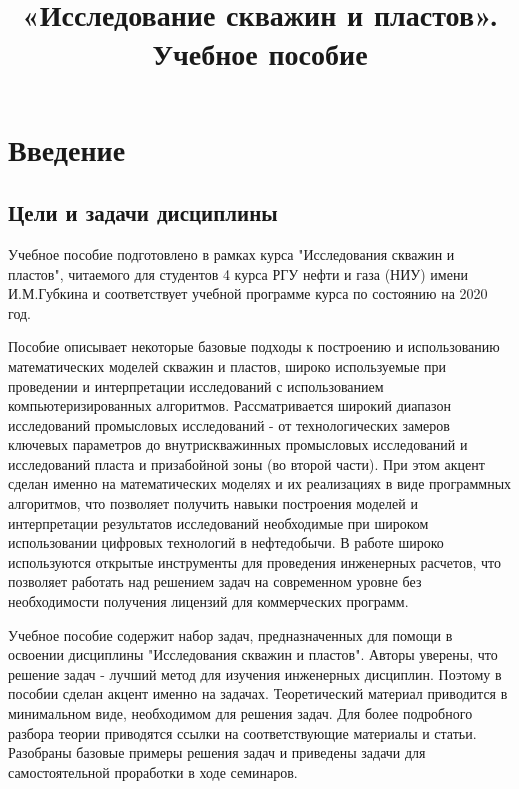 \documentclass{memoir}
\begin{document}
\title{«Исследование скважин и пластов». Учебное пособие }

\maketitle

\tableofcontents{}
\chapter{Введение}

\section{Цели и задачи дисциплины}
Учебное пособие подготовлено в рамках курса "Исследования скважин и пластов", читаемого для студентов 4 курса РГУ нефти и газа (НИУ) имени И.М.Губкина и соответствует учебной программе курса по состоянию на 2020 год. 

Пособие описывает некоторые базовые подходы к построению и использованию математических моделей скважин и пластов, широко используемые при проведении и интерпретации исследований с использованием компьютеризированных алгоритмов. Рассматривается широкий диапазон исследований промысловых исследований - от технологических замеров ключевых параметров до внутрискважинных промысловых исследований и исследований пласта и призабойной зоны (во второй части). При этом акцент сделан именно на математических моделях и их реализациях в виде программных алгоритмов, что позволяет получить навыки построения моделей и интерпретации результатов исследований необходимые при широком использовании цифровых технологий в нефтедобычи. В работе широко используются открытые инструменты для проведения инженерных расчетов, что позволяет работать над решением задач на современном уровне без необходимости получения лицензий для коммерческих программ. 

Учебное пособие содержит набор задач, предназначенных для помощи в освоении дисциплины "Исследования скважин и пластов". Авторы уверены, что решение задач - лучший метод для изучения инженерных дисциплин. Поэтому в пособии сделан акцент именно на задачах. Теоретический материал приводится в минимальном виде, необходимом для решения задач. Для более подробного разбора теории приводятся ссылки на соответствующие материалы и статьи. Разобраны базовые примеры решения задач и приведены задачи для самостоятельной проработки в ходе семинаров. 
\end{document}
